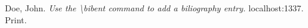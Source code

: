 
\bibent Doe, John. \textit{Use the \textbackslash bibent command to add a
biliography entry.} localhost:1337. Print.
